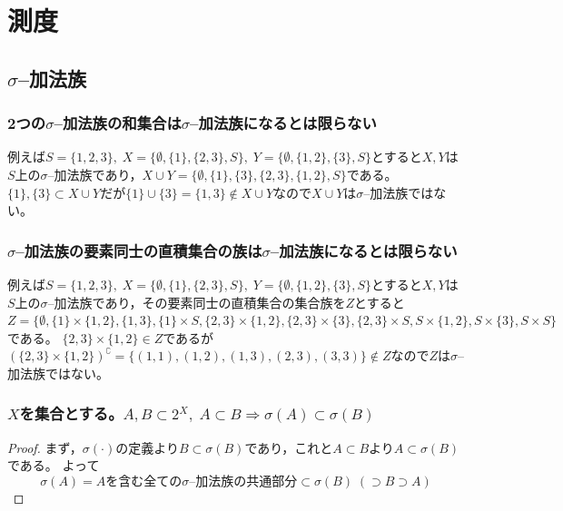 \chapter{測度}
    \newcommand*{\mJi}[1]{\protect\underline{m}_\textrm{J}\left(#1\right)}
    \newcommand*{\mJo}[1]{\protect\overline{m}_\textrm{J}\left(#1\right)}
    \newcommand*{\mJordan}[1]{m_\textrm{J}\left(#1\right)}	%
    \section{\texorpdfstring{$\sigma$}{σ}--加法族}
        \subsection{2つの\texorpdfstring{$\sigma$}{σ}--加法族の和集合は\texorpdfstring{$\sigma$}{σ}--加法族になるとは限らない}
            例えば$S=\{1,2,3\},\;X=\{\emptyset,\{1\},\{2,3\},S\},\;Y=\{\emptyset,\{1,2\},\{3\},S\}$とすると$X,Y$は$S$上の$\sigma$--加法族であり，$X\cup Y=\{\emptyset,\{1\},\{3\},\{2,3\},\{1,2\},S\}$である。$\{1\},\{3\}\subset X\cup Y$だが$\{1\}\cup\{3\} = \{1,3\} \notin X\cup Y$なので$X\cup Y$は$\sigma$--加法族ではない。
        \subsection{\texorpdfstring{$\sigma$}{σ}--加法族の要素同士の直積集合の族は\texorpdfstring{$\sigma$}{σ}--加法族になるとは限らない}
            例えば$S=\{1,2,3\},\;X=\{\emptyset,\{1\},\{2,3\},S\},\;Y=\{\emptyset,\{1,2\},\{3\},S\}$とすると$X,Y$は$S$上の$\sigma$--加法族であり，その要素同士の直積集合の集合族を$Z$とすると
            $Z=\{\emptyset,\{1\}\times\{1,2\},\{1,3\},\{1\}\times S,\{2,3\}\times\{1,2\},\{2,3\}\times\{3\},\{2,3\}\times S,S\times\{1,2\},S\times\{3\},S\times S\}$である。
            $\{2,3\}\times\{1,2\}\in Z$であるが$(\{2,3\}\times\{1,2\})^\complement = \{(1,1),(1,2),(1,3),(2,3),(3,3)\} \notin Z$なので$Z$は$\sigma$--加法族ではない。
        \subsection{\texorpdfstring{$X$}{X}を集合とする。\texorpdfstring{$A,B\subset 2^X,\;A\subset B\Rightarrow\sigma(A)\subset\sigma(B)$}{A,B⊂2\string^X, A⊂B ⇒ σ(A)⊂σ(B)}}
            \begin{proof}
                \quad\par
                まず，$\sigma(\cdot)$の定義より$B\subset\sigma(B)$であり，これと$A\subset B$より$A\subset\sigma(B)$である。
                よって
                \[ \sigma(A) = A\text{を含む全ての}\sigma\text{--加法族の共通部分} \subset \sigma(B)\;(\supset B \supset A) \]
            \end{proof}
